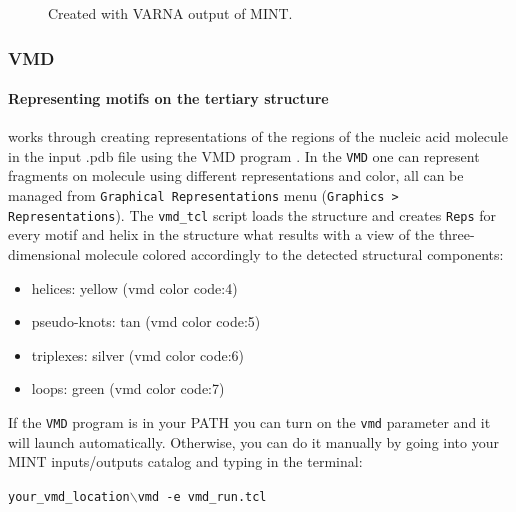 \documentclass[12pt]{article}
\begin{document}
\begin{figure}[h!]
\centering
\label{varna}

\end{figure}

\begin{figure}[h!]
\begin{center}
\end{center}
\caption{Created with VARNA output of MINT.}
\end{figure}

\subsubsection{VMD} 
\label{VMD}
\paragraph{Representing motifs on the tertiary structure} works through creating representations of the regions of the nucleic acid molecule in the input .pdb file using the VMD program \cite{Humphrey1996}. In the \texttt{VMD} one can represent fragments on molecule using different representations and color, all can be managed from \texttt{Graphical Representations} menu (\texttt{Graphics > Representations}). The \texttt{vmd\_tcl} script loads the structure and creates \texttt{Reps} for every motif and helix in the structure what results with a view of the three-dimensional molecule colored accordingly to the detected structural components:

\begin{itemize}
\item helices: yellow (vmd color code:4)
\item pseudo-knots: tan (vmd color code:5)
\item triplexes: silver (vmd color code:6)
\item loops: green (vmd color code:7)
\end{itemize}

If the \texttt{VMD} program is in your PATH you can turn on the \texttt{vmd} parameter and it will launch automatically. Otherwise, you can do it manually by going into your MINT inputs/outputs catalog and typing in the terminal:

\texttt{your\_vmd\_location$\backslash$vmd -e vmd\_run.tcl }
\end{document}
